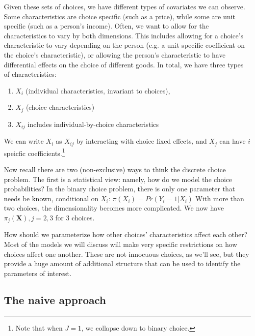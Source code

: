 \documentclass{tufte-handout}
\theoremstyle{break}
\begin{document}
Given these sets of choices, we have different types of covariates we can observe. Some characteristics are choice specific (such as a price), while some are unit specific (such as a person's income). Often, we want to allow for the characteristics to vary by both dimensions. This includes allowing for a choice's characteristic to vary depending on the person (e.g. a unit specific coefficient on the choice's  characteristic), or allowing the person's characteristic to have differential effects on the choice of different goods. In total, we have three types of characteristics:
\begin{enumerate}
\item $X_{i}$ (individual characteristics, invariant to choices),
\item   $X_{j}$ (choice characteristics) 
\item  $X_{ij}$ includes individual-by-choice characteristics
\end{enumerate}
We can write $X_{i}$ as $X_{ij}$ by interacting with choice  fixed effects, and $X_{j}$ can have $i$ speicfic coefficients.\footnote{Note that when $J = 1$, we collapse down to binary choice.}

Now recall there are two (non-exclusive) ways to think the discrete choice problem.  The first is a statistical view: namely, how do we model the choice probabilities? In the binary choice problem, there is only one parameter that needs be known, conditional on $X_{i}$:  $\pi(X_{i}) = Pr(Y_{i} = 1 |X _{i})$  With more than two choices, the dimensionality becomes more complicated.  We now have  $\pi_{j}(\mathbf{X}), j=2,3$ for 3 choices. 

 How should we parameterize how other choices' characteristics affect each other? Most of the models we will discuss will make very specific restrictions on how choices affect one another.  These are not innocuous choices, as we'll see, but they provide a huge amount of additional structure that can be used to identify the parameters of interest.
      
\subsection{The naive approach}
\end{document}
